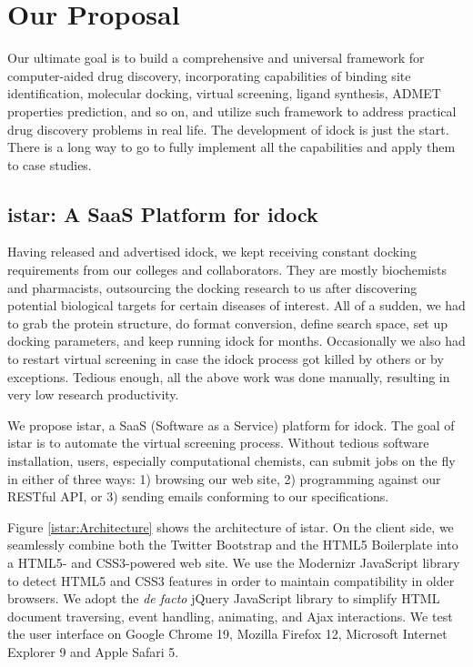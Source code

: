 \chapter{Our Proposal}

Our ultimate goal is to build a comprehensive and universal framework for computer-aided drug discovery, incorporating capabilities of binding site identification, molecular docking, virtual screening, ligand synthesis, ADMET properties prediction, and so on, and utilize such framework to address practical drug discovery problems in real life. The development of idock is just the start. There is a long way to go to fully implement all the capabilities and apply them to case studies.

\section{istar: A SaaS Platform for idock}

Having released and advertised idock, we kept receiving constant docking requirements from our colleges and collaborators. They are mostly biochemists and pharmacists, outsourcing the docking research to us after discovering potential biological targets for certain diseases of interest. All of a sudden, we had to grab the protein structure, do format conversion, define search space, set up docking parameters, and keep running idock for months. Occasionally we also had to restart virtual screening in case the idock process got killed by others or by exceptions. Tedious enough, all the above work was done manually, resulting in very low research productivity.

We propose istar, a SaaS (Software as a Service) platform for idock. The goal of istar is to automate the virtual screening process. Without tedious software installation, users, especially computational chemists, can submit jobs on the fly in either of three ways: 1) browsing our web site, 2) programming against our RESTful API, or 3) sending emails conforming to our specifications.

Figure \ref{istar:Architecture} shows the architecture of istar. On the client side, we seamlessly combine both the Twitter Bootstrap and the HTML5 Boilerplate into a HTML5- and CSS3-powered web site. We use the Modernizr JavaScript library to detect HTML5 and CSS3 features in order to maintain compatibility in older browsers. We adopt the \textit{de facto} jQuery JavaScript library to simplify HTML document traversing, event handling, animating, and Ajax interactions. We test the user interface on Google Chrome 19, Mozilla Firefox 12, Microsoft Internet Explorer 9 and Apple Safari 5.

